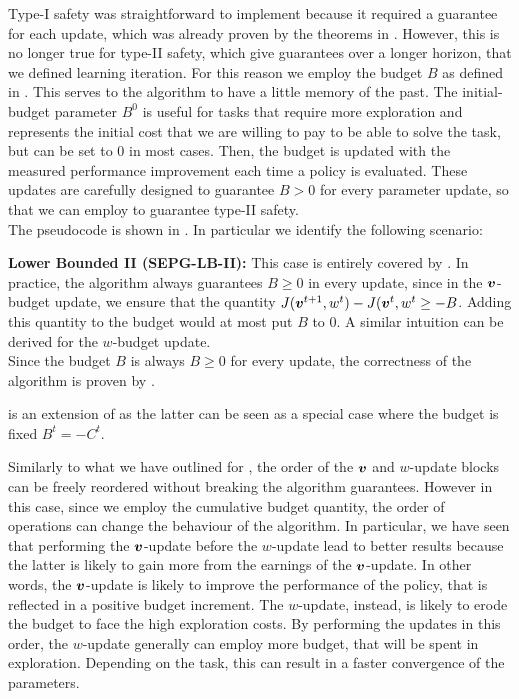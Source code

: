 Type-I safety was straightforward to implement because it required a guarantee for each update, which was already proven by the theorems in . However, this is no longer true for type-II safety, which give guarantees over a longer horizon, that we defined learning iteration. For this reason we employ the budget $B$ as defined in . This serves to the algorithm to have a little memory of the past. The initial-budget parameter $B^0$ is useful for tasks that require more exploration and represents the initial cost that we are willing to pay to be able to solve the task, but can be set to $0$ in most cases. Then, the budget is updated with the measured performance improvement each time a policy is evaluated. These updates are carefully designed to guarantee $B>0$ for every parameter update, so that we can employ  to guarantee type-II safety.\\
The pseudocode is shown in . In particular we identify the following scenario:

\textbf{Lower Bounded II (SEPG-LB-II):} This case is entirely covered by . In practice, the algorithm always guarantees $B\geq0$ in every update, since in the $\boldsymbol{v}$-budget update, we ensure that the quantity $J(\boldsymbol{v}^{t+1}, w^t) - J(\boldsymbol{v}^t, w^t \geq -B$. Adding this quantity to the budget would at most put $B$ to $0$. A similar intuition can be derived for the $w$-budget update.\\
Since the budget $B$ is always $B\geq0$ for every update, the correctness of the algorithm is proven by .

\begin{note}
 is an extension of  as the latter can be seen as a special case where the budget is fixed $B^t=-C^t$.
\end{note}
\begin{note}
Similarly to what we have outlined for , the order of the $\boldsymbol{v}$ and $w$-update blocks can be freely reordered without breaking the algorithm guarantees. However in this case, since we employ the cumulative budget quantity, the order of operations can change the behaviour of the algorithm.
In particular, we have seen that performing the $\boldsymbol{v}$-update before the $w$-update lead to better results because the latter  is likely to gain more from the earnings of the $\boldsymbol{v}$-update. In other words, the $\boldsymbol{v}$-update is likely to improve the performance of the policy, that is reflected in a positive budget increment. The $w$-update, instead, is likely to erode the budget to face the high exploration costs. By performing the updates in this order, the $w$-update generally can employ more budget, that will be spent in exploration. Depending on the task, this can result in a faster convergence of the parameters.
\end{note}

